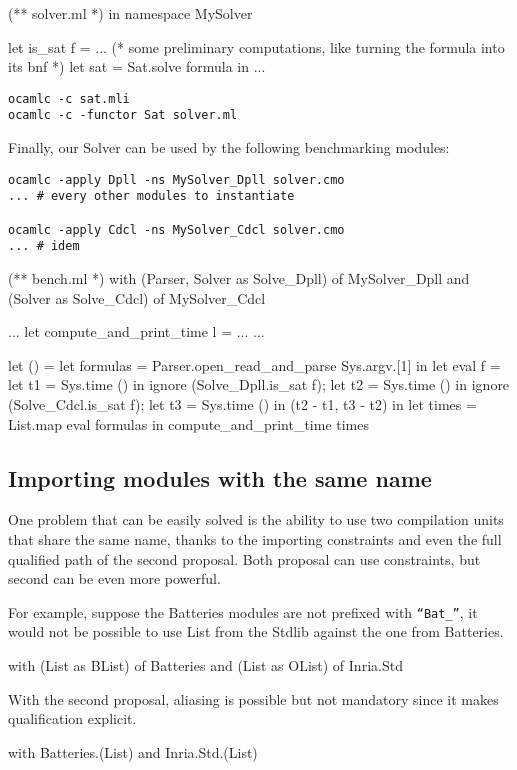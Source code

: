 \medskip 

\begin{OCaml}
(** solver.ml *)
in namespace MySolver

let is_sat f =
... 
(* some preliminary computations, like turning the formula into its bnf *)
  let sat = Sat.solve formula in 
...
\end{OCaml}

\begin{verbatim}
ocamlc -c sat.mli
ocamlc -c -functor Sat solver.ml
\end{verbatim}

\medskip

Finally, our Solver can be used by the following benchmarking modules:

\begin{verbatim}
ocamlc -apply Dpll -ns MySolver_Dpll solver.cmo
... # every other modules to instantiate

ocamlc -apply Cdcl -ns MySolver_Cdcl solver.cmo
... # idem 
\end{verbatim}

\begin{OCaml}
(** bench.ml *)
with (Parser, Solver as Solve_Dpll) of MySolver_Dpll
and (Solver as Solve_Cdcl) of MySolver_Cdcl

...
let compute_and_print_time l = ...
...

let () =
  let formulas = 
    Parser.open_read_and_parse Sys.argv.[1] in
  let eval f =
    let t1 = Sys.time () in
    ignore (Solve_Dpll.is_sat f);
    let t2 = Sys.time () in
    ignore (Solve_Cdcl.is_sat f);
    let t3 = Sys.time () in
    (t2 - t1, t3 - t2)
  in
  let times = List.map eval formulas in
  compute_and_print_time times
\end{OCaml}

\subsection{Importing modules with the same name}

One problem that can be easily solved is the ability to use two compilation
units that share the same name, thanks to the importing constraints and even the
full qualified path of the second proposal. Both proposal can use constraints,
but second can be even more powerful.

For example, suppose the Batteries modules are not prefixed with
\texttt{``Bat\_''}, it would not be possible to use List from the Stdlib against
the one from Batteries.

\begin{OCaml}
with (List as BList) of Batteries
and (List as OList) of Inria.Std
\end{OCaml}

With the second proposal, aliasing is possible but not mandatory since it makes
qualification explicit.

\begin{OCaml}
with Batteries.(List)
and Inria.Std.(List)
\end{OCaml}
